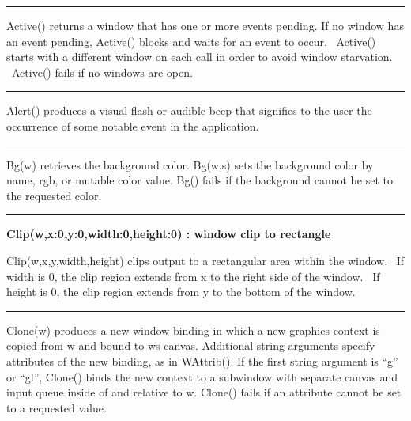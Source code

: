 \bigskip\hrule\vspace{0.1cm}

\noindent
\textsf{Active()} returns a window that has one or more events pending.
If no window has an event pending, \textsf{Active()} blocks and waits
for an event to occur. \ \textsf{Active()} starts with a different
window on each call in order to avoid window
{\textquotedbl}starvation{\textquotedbl}. \ \textsf{Active()} fails if
no windows are open.

\bigskip\hrule\vspace{0.1cm}

\noindent
\textsf{Alert()} produces a visual flash or audible beep that signifies
to the user the occurrence of some notable event in the application.

\bigskip\hrule\vspace{0.1cm}

\noindent
\textsf{Bg(w)} retrieves the background color. \textsf{Bg(w,s)} sets the
background color by name, rgb, or mutable color value. \textsf{Bg()}
fails if the background cannot be set to the requested color.

\bigskip\hrule\vspace{0.1cm}
\noindent
{\bf Clip(w,x:0,y:0,width:0,height:0) : window \hfill clip to rectangle}

\noindent
\textsf{Clip(w,x,y,width,height)} clips output to a rectangular area
within the window. \ If \textsf{width} is 0, the clip region extends
from \textsf{x} to the right side of the window. \ If \textsf{height}
is 0, the clip region extends from \textsf{y} to the bottom of the
window.

\bigskip\hrule\vspace{0.1cm}

\noindent
\textsf{Clone(w)} produces a new window binding in which a new graphics
context is copied from \textsf{w} and bound to
\textsf{w}{\textquotesingle}s canvas. Additional string arguments
specify attributes of the new binding, as in \textsf{WAttrib()}. If the
first string argument is
\textsf{{\textquotedblleft}g{\textquotedblright}} or
\textsf{{\textquotedblleft}gl{\textquotedblright}}, \textsf{Clone()}
binds the new context to a subwindow with separate canvas and input
queue inside of and relative to \textsf{w}. \textsf{Clone()} fails if
an attribute cannot be set to a requested value.


